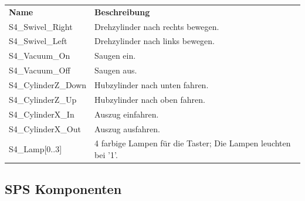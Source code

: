 \documentclass[11pt,a4paper,ngerman]{article}
\begin{document}
\begin{center}
	\begin{tabularx}{\textwidth}{|p{4cm}|X|}
		\hline
		\rowcolor{tublau}
		\multicolumn{2}{|c|}{\bf \color{white} \large Aktoren}\\
		\hline\hline
		\rowcolor{gray!80}
		\bf Name & \bf Beschreibung\\
		\hline\hline
		S4\_Swivel\_Right & Drehzylinder nach rechts bewegen.\\
		S4\_Swivel\_Left & Drehzylinder nach links bewegen.\\
		S4\_Vacuum\_On & Saugen ein.\\
		S4\_Vacuum\_Off & Saugen aus.\\
		S4\_CylinderZ\_Down & Hubzylinder nach unten fahren.\\
		S4\_CylinderZ\_Up & Hubzylinder nach oben fahren.\\
		S4\_CylinderX\_In & Auszug einfahren.\\
		S4\_CylinderX\_Out & Auszug ausfahren.\\
		S4\_Lamp[0..3] & 4 farbige Lampen für die Taster; Die Lampen leuchten bei '1'.\\
		\hline
	\end{tabularx}
\end{center}

\subsection{SPS Komponenten}
\end{document}
